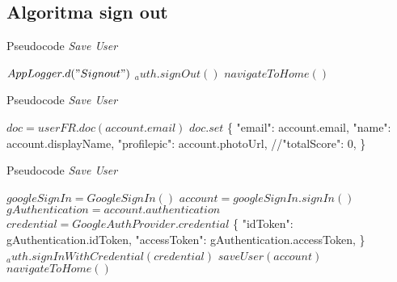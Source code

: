 \subsection{Algoritma sign out}
\begin{algorithm}[H]
    \caption{Pseudocode \textit{Save User}}
    \begin{algorithmic}
          \State $AppLogger.d("Sign out")$
            \State $_auth.signOut()$
            \State $navigateToHome()$
        \EndFunction
    \end{algorithmic}
\end{algorithm}

\begin{algorithm}[H]
    \caption{Pseudocode \textit{Save User}}
    \begin{algorithmic}
        \State $doc = userFR.doc(account.email)$
        \State $doc.set$ \{
            "email": account.email,
            "name": account.displayName,
            "profilepic": account.photoUrl,
            //"totalScore": 0,
        \}
        \EndFunction
    \end{algorithmic}
\end{algorithm}
\begin{algorithm}[H]
    \caption{Pseudocode \textit{Save User}}
    \begin{algorithmic}
          \State $googleSignIn = GoogleSignIn()$
            \State $account = googleSignIn.signIn()$
              \State $gAuthentication = account.authentication$
              \State $credential = GoogleAuthProvider.credential$ \{
                "idToken": gAuthentication.idToken,
                "accessToken": gAuthentication.accessToken,
              \}
              \State $_auth.signInWithCredential(credential)$
              \State $saveUser(account)$
              \State $navigateToHome()$
            \EndIf
        \EndFunction
    \end{algorithmic}
\end{algorithm}
